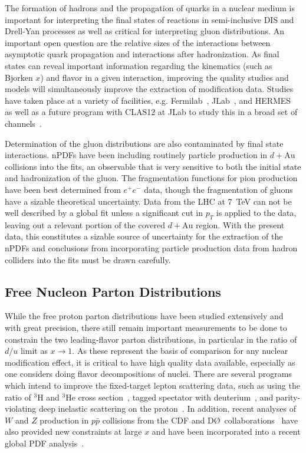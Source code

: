 The formation of hadrons and the propagation of quarks in a nuclear medium is important for interpreting the final states of reactions in semi-inclusive DIS and Drell-Yan processes as well as critical for interpreting gluon distributions.  An important open question are the relative sizes of the interactions between asymptotic quark propagation and interactions after hadronization.  As final states can reveal important information regarding the kinematics (such as Bjorken $x$) and flavor in a given interaction, improving the quality studies and models will simultaneously improve the extraction of modification data.  Studies have taken place at a variety of facilities, e.g. Fermilab~\cite{PhysRevC.75.035206}, JLab~\cite{PhysRevLett.99.242502, ELFASSI2012326}, and HERMES~\cite{Airapetian2011} as well as a future program with CLAS12 at JLab to study this in a broad set of channels~\cite{quarkformprop}.

Determination of the gluon distributions are also contaminated by final state interactions. nPDFs have been including routinely particle production in $d+\mathrm{Au}$ collisions into the fits, an observable that is very sensitive to both the initial state and hadronization of the gluon. The fragmentation functions for pion production have been best determined from $e^+e^-$ data, though the fragmentation of gluons have a sizable theoretical uncertainty. Data from the LHC at $7$~TeV can not be well described by a global fit unless a significant cut in $p_{T}$ is applied to the data, leaving out a relevant portion of the covered $d+\mathrm{Au}$ region.  With the present data, this constitutes a sizable source of uncertainty for the extraction of the nPDFs and conclusions from incorporating particle production data from hadron colliders into the fits must be drawn carefully.

\subsection{Free Nucleon Parton Distributions}

While the free proton parton distributions have been studied extensively and with great precision, there still remain important measurements to be done to constrain the two leading-flavor parton distributions, in particular in the ratio of $d/u$ limit as $x \rightarrow 1$.  As these represent the basis of comparison for any nuclear modification effect, it is critical to have high quality data available, especially as one considers doing flavor decompositions of nuclei.  There are several programs which intend to improve the fixed-target lepton scattering data, such as using the ratio of ${}^{3}$H and ${}^{3}$He cross section~\cite{mar}, tagged spectator with deuterium~\cite{bonus12}, and parity-violating deep inelastic scattering on the proton~\cite{solid_pvdis}.  In addition, recent analyses of $W$ and $Z$ production in $p\bar{p}$ collisions from the CDF and D\O\ collaborations~\cite{D0:2014kma,Abazov:2013dsa,Acosta:2005ud,Aaltonen:2009ta,Aaltonen:2010zza,Abazov:2007jy} have also provided new constraints at large $x$ and have been incorporated into a recent global PDF analysis~\cite{Accardi:2016qay}.

